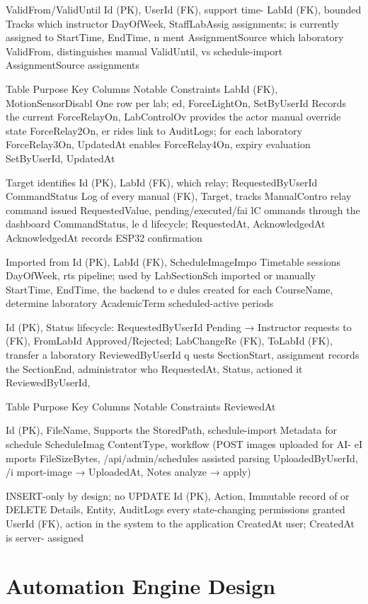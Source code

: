ValidFrom/ValidUntil
Id (PK), UserId (FK),
support time-
LabId (FK),
bounded
Tracks which instructor DayOfWeek,
StaffLabAssig assignments;
is currently assigned to StartTime, EndTime,
n ment AssignmentSource
which laboratory ValidFrom,
distinguishes manual
ValidUntil,
vs schedule-import
AssignmentSource
assignments



Table Purpose Key Columns Notable Constraints
LabId (FK),
MotionSensorDisabl
One row per lab;
ed, ForceLightOn,
SetByUserId
Records the current ForceRelayOn,
LabControlOv provides the actor
manual override state ForceRelay2On,
er rides link to AuditLogs;
for each laboratory ForceRelay3On,
UpdatedAt enables
ForceRelay4On,
expiry evaluation
SetByUserId,
UpdatedAt

Target identifies
Id (PK), LabId (FK), which relay;
RequestedByUserId CommandStatus
Log of every manual (FK), Target, tracks
ManualContro
relay command issued RequestedValue, pending/executed/fai
lC ommands
through the dashboard CommandStatus, le d lifecycle;
RequestedAt, AcknowledgedAt
AcknowledgedAt records ESP32
confirmation

Imported from
Id (PK), LabId (FK), ScheduleImageImpo
Timetable sessions
DayOfWeek, rts pipeline; used by
LabSectionSch imported or manually
StartTime, EndTime, the backend to
e dules created for each
CourseName, determine
laboratory
AcademicTerm scheduled-active
periods

Id (PK), Status lifecycle:
RequestedByUserId Pending →
Instructor requests to (FK), FromLabId Approved/Rejected;
LabChangeRe (FK), ToLabId (FK),
transfer a laboratory ReviewedByUserId
q uests SectionStart,
assignment records the
SectionEnd, administrator who
RequestedAt, Status, actioned it
ReviewedByUserId,


Table Purpose Key Columns Notable Constraints
ReviewedAt

Id (PK), FileName, Supports the
StoredPath, schedule-import
Metadata for schedule
ScheduleImag ContentType, workflow (POST
images uploaded for AI-
eI mports FileSizeBytes, /api/admin/schedules
assisted parsing
UploadedByUserId, /i mport-image →
UploadedAt, Notes analyze → apply)

INSERT-only by
design; no UPDATE
Id (PK), Action,
Immutable record of or DELETE
Details, Entity,
AuditLogs every state-changing permissions granted
UserId (FK),
action in the system to the application
CreatedAt
user; CreatedAt is
server- assigned




\section{Automation Engine Design}


